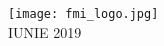 \begin{titlepage}
	
	
	
	\texttt{[image: fmi\_logo.jpg]}\\[1cm] %
	
	\vfill %
	{\large IUNIE 2019}\\[3cm] %
	
	
\end{titlepage}